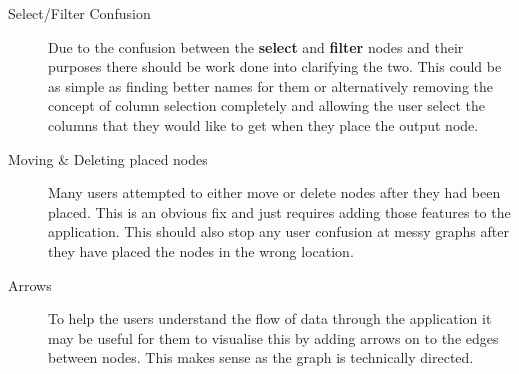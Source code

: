 \begin{description}
\begin{itemize}
\end{itemize}

\item[Select/Filter Confusion] \hfill

Due to the confusion between the \textbf{select} and \textbf{filter} nodes and
their purposes there should be work done into clarifying the two. This could be
as simple as finding better names for them or alternatively removing the
concept of column selection completely and allowing the user select the columns
that they would like to get when they place the output node.

\item[Moving \& Deleting placed nodes] \hfill

Many users attempted to either move or delete nodes after they had been placed.
This is an obvious fix and just requires adding those features to the
application. This should also stop any user confusion at messy graphs after
they have placed the nodes in the wrong location.

\item[Arrows] \hfill

To help the users understand the flow of data through the application it may be
useful for them to visualise this by adding arrows on to the edges between
nodes. This makes sense as the graph is technically directed.

\end{description}
